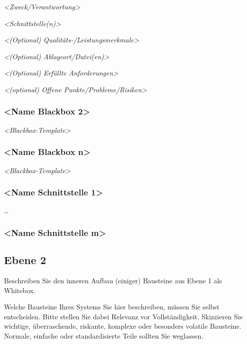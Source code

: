 \documentclass[a4paper,12pt]{article}
\begin{document}
\emph{\textless Zweck/Verantwortung\textgreater{}}

\emph{\textless Schnittstelle(n)\textgreater{}}

\emph{\textless(Optional) Qualitäts-/Leistungsmerkmale\textgreater{}}

\emph{\textless(Optional) Ablageort/Datei(en)\textgreater{}}

\emph{\textless(Optional) Erfüllte Anforderungen\textgreater{}}

\emph{\textless(optional) Offene Punkte/Probleme/Risiken\textgreater{}}

\subsubsection{\textless Name Blackbox
2\textgreater{}}\label{_name_blackbox_2}

\emph{\textless Blackbox-Template\textgreater{}}

\subsubsection{\textless Name Blackbox
n\textgreater{}}\label{_name_blackbox_n}

\emph{\textless Blackbox-Template\textgreater{}}

\subsubsection{\textless Name Schnittstelle
1\textgreater{}}\label{_name_schnittstelle_1}

\ldots\hspace{0pt}

\subsubsection{\textless Name Schnittstelle
m\textgreater{}}\label{_name_schnittstelle_m}

\subsection{Ebene 2}\label{_ebene_2}

Beschreiben Sie den inneren Aufbau (einiger) Bausteine aus Ebene 1 als
Whitebox.

Welche Bausteine Ihres Systems Sie hier beschreiben, müssen Sie selbst
entscheiden. Bitte stellen Sie dabei Relevanz vor Vollständigkeit.
Skizzieren Sie wichtige, überraschende, riskante, komplexe oder
besonders volatile Bausteine. Normale, einfache oder standardisierte
Teile sollten Sie weglassen.
\end{document}
